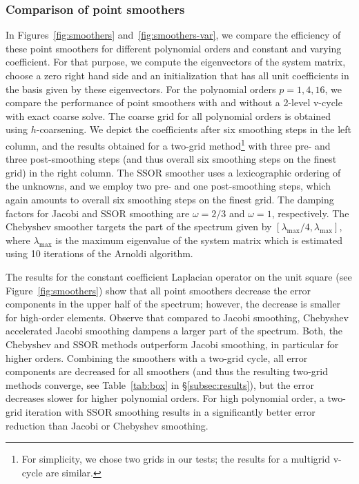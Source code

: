 \documentclass[times]{nlaauth}
\begin{document}

\subsubsection{Comparison of point smoothers}\label{subsubsec:ptsmoothcomparison}
In Figures~\ref{fig:smoothers} and~\ref{fig:smoothers-var}, we compare
the efficiency of these point smoothers for different polynomial
orders and constant and varying coefficient. For that purpose, we
compute the eigenvectors of the system matrix, choose a
zero right hand side and an initialization that has all unit
coefficients in the basis given by these eigenvectors. For the
polynomial orders $p=1,4,16$, we compare the performance of point
smoothers with and without a 2-level v-cycle with exact coarse solve.
The coarse grid for all polynomial orders is obtained using $h$-coarsening.
We depict the
coefficients after six smoothing steps in the left column, and the results
obtained for a two-grid method\footnote{For simplicity, we chose two
  grids in our tests; the results for a multigrid v-cycle are
  similar.} with three pre- and three post-smoothing steps (and thus overall six
smoothing steps on the finest grid) in the right column. The SSOR smoother
uses a lexicographic ordering of the unknowns, and we employ two pre- and one
post-smoothing steps, which again amounts to overall six smoothing steps
on the finest grid. The damping factors for Jacobi and SSOR smoothing
are $\omega = 2/3$ and $\omega=1$, respectively. The Chebyshev
smoother targets the part of the
spectrum given by $[\lambda_\text{max}/4,\lambda_\text{max}]$, where
$\lambda_\text{max}$ is the maximum eigenvalue of the system matrix which is estimated using 10 iterations of the Arnoldi algorithm.

The results for the constant coefficient Laplacian operator on the
unit square (see Figure~\ref{fig:smoothers}) show that all point smoothers
decrease the error components in the upper half of the spectrum;
however,
the decrease is smaller for high-order elements. Observe that compared to Jacobi smoothing, Chebyshev accelerated Jacobi smoothing dampens a larger
part of the spectrum.  Both, the Chebyshev and
SSOR methods outperform Jacobi smoothing, in particular for higher
orders. Combining the smoothers with a two-grid cycle, all error
components are decreased for all smoothers (and thus the resulting
two-grid methods converge, see Table~\ref{tab:box} in \S\ref{subsec:results}), but the error decreases slower for
higher polynomial orders. For high polynomial order, a two-grid
iteration with SSOR smoothing results in a significantly better error
reduction than Jacobi or Chebyshev smoothing.
\end{document}
